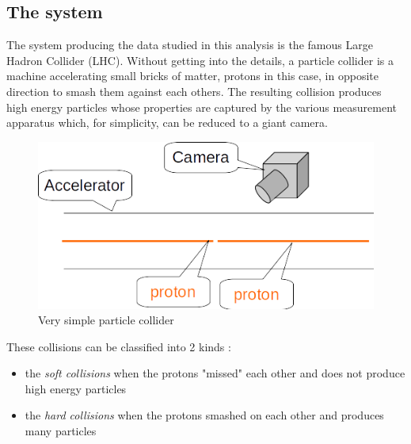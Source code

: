 \subsection{The system} %
\label{sub:the_system}

The system producing the data studied in this analysis is the famous Large Hadron Collider (LHC).
Without getting into the details, a particle collider is a machine accelerating small bricks of matter, protons in this case, in opposite direction to smash them against each others.
The resulting collision produces high energy particles whose properties are captured by the various measurement apparatus which, for simplicity, can be reduced to a giant camera.


\begin{figure}[htb]
    \centering
    \includegraphics[width=0.8\linewidth]{particle_collider_0}
    \caption{Very simple particle collider}
    \label{fig:particle_collider_0}
\end{figure}


These collisions can be classified into 2 kinds :
\begin{itemize}
	\item the \emph{soft collisions} when the protons "missed" each other and does not produce high energy particles
	\item the \emph{hard collisions} when the protons smashed on each other and produces many particles
\end{itemize}

